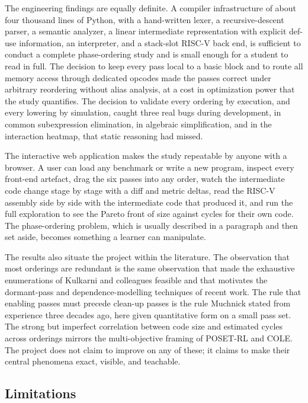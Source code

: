 The engineering findings are equally definite. A compiler infrastructure of about four thousand lines of Python, with a hand-written lexer, a recursive-descent parser, a semantic analyzer, a linear intermediate representation with explicit def-use information, an interpreter, and a stack-slot RISC-V back end, is sufficient to conduct a complete phase-ordering study and is small enough for a student to read in full. The decision to keep every pass local to a basic block and to route all memory access through dedicated opcodes made the passes correct under arbitrary reordering without alias analysis, at a cost in optimization power that the study quantifies. The decision to validate every ordering by execution, and every lowering by simulation, caught three real bugs during development, in common subexpression elimination, in algebraic simplification, and in the interaction heatmap, that static reasoning had missed.

The interactive web application makes the study repeatable by anyone with a browser. A user can load any benchmark or write a new program, inspect every front-end artefact, drag the six passes into any order, watch the intermediate code change stage by stage with a diff and metric deltas, read the RISC-V assembly side by side with the intermediate code that produced it, and run the full exploration to see the Pareto front of size against cycles for their own code. The phase-ordering problem, which is usually described in a paragraph and then set aside, becomes something a learner can manipulate.

The results also situate the project within the literature. The observation that most orderings are redundant is the same observation that made the exhaustive enumerations of Kulkarni and colleagues feasible and that motivates the dormant-pass and dependence-modelling techniques of recent work. The rule that enabling passes must precede clean-up passes is the rule Muchnick stated from experience three decades ago, here given quantitative form on a small pass set. The strong but imperfect correlation between code size and estimated cycles across orderings mirrors the multi-objective framing of POSET-RL and COLE. The project does not claim to improve on any of these; it claims to make their central phenomena exact, visible, and teachable.

\subsection{Limitations}

